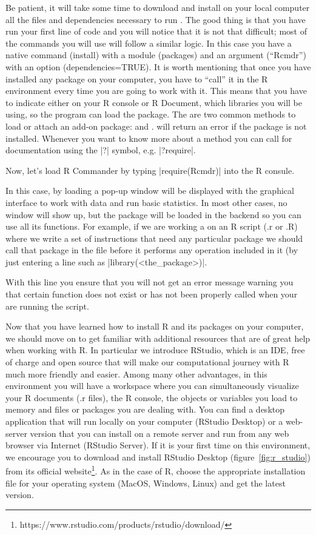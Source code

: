 Be patient, it will take some time to download and install on your
local computer all the files and dependencies necessary to run . The good thing is that you have run your first line of
code and you will notice that it is not that difficult; most of the
commands you will use will follow a similar logic. In this case you
have a native command (install) with a module (packages) and an
argument (``Rcmdr'') with an option (dependencies=TRUE). It is worth
mentioning that once you have installed any package on your computer,
you have to ``call'' it in the R environment every time you are going
to work with it. This means that you have to indicate either on your R
console or R Document, which libraries you will be using, so the
program can load the package. The are two common methods to load or
attach an add-on package:  and . 
will return an error if the package is not installed. Whenever you
want to know more about a method you can call for documentation using
the |?| symbol, e.g. |?require|.

Now, let’s load R Commander by typing |require(Rcmdr)| into the R consule.

In this case, by loading  a pop-up window will be displayed
with the graphical interface to work with data and run basic
statistics. In most other cases, no window will show up, but the
package will be loaded in the backend so you can use all its
functions. For example, if we are working a on an R script (.r or .R)
where we write a set of instructions that need any particular package
we should call that package in the file before it performs any
operation included in it (by just entering a line such as
|library(<the_package>)|.

With this line you ensure that you will not get an error message
warning you that certain function does not exist or has not been
properly called when your are running the script.

Now that you have learned how to install R and its packages on your
computer, we should move on to get familiar with additional resources
that are of great help when working with R. In particular we introduce
RStudio, which is an IDE, free of charge and open source that will
make our computational journey with R much more friendly and
easier. Among many other advantages, in this environment you will have
a workspace where you can simultaneously visualize your R documents
(.r files), the R console, the objects or variables you load to memory
and files or packages you are dealing with. You can find a desktop
application that will run locally on your computer (RStudio Desktop)
or a web-server version that you can install on a remote server and
run from any web browser via Internet (RStudio Server). If it is your
first time on this environment, we encourage you to download and
install RStudio Desktop (figure~\ref{fig:r_studio}) from its official
website\footnote{https://www.rstudio.com/products/rstudio/download/}. As
in the case of R, choose the appropriate installation file for
your operating system (MacOS, Windows, Linux) and get the latest
version.


